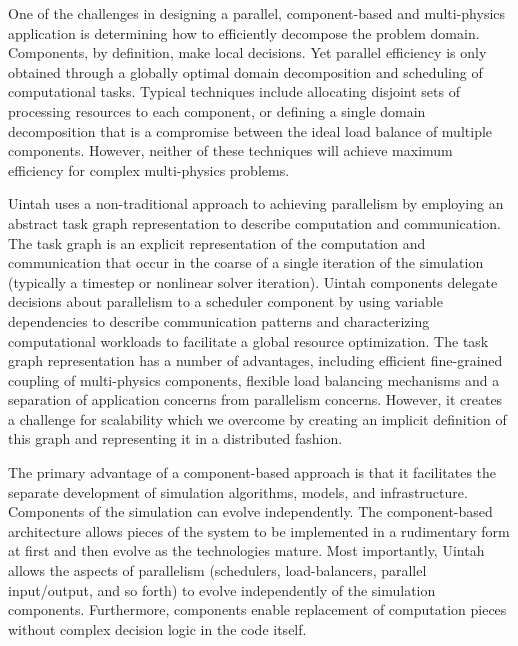 One of the challenges in designing a parallel, component-based and
multi-physics application is determining how to efficiently decompose
the problem domain. Components, by definition, make local
decisions. Yet parallel efficiency is only obtained through a globally
optimal domain decomposition and scheduling of computational
tasks. Typical techniques include allocating disjoint sets of
processing resources to each component, or defining a single domain
decomposition that is a compromise between the ideal load balance of
multiple components. However, neither of these techniques will achieve
maximum efficiency for complex multi-physics problems.

Uintah uses a non-traditional approach to achieving parallelism by
employing an abstract task graph representation to describe
computation and communication. The task graph is an explicit
representation of the computation and communication that occur in the
coarse of a single iteration of the simulation (typically a timestep
or nonlinear solver iteration). Uintah components delegate decisions
about parallelism to a scheduler component by using variable
dependencies to describe communication patterns and characterizing
computational workloads to facilitate a global resource
optimization. The task graph representation has a number of
advantages, including efficient fine-grained coupling of multi-physics
components, flexible load balancing mechanisms and a separation of
application concerns from parallelism concerns. However, it creates a
challenge for scalability which we overcome by creating an implicit
definition of this graph and representing it in a distributed fashion.


The primary advantage of a component-based approach is that it
facilitates the separate development of simulation algorithms, models,
and infrastructure. Components of the simulation can evolve
independently. The component-based architecture allows pieces of the
system to be implemented in a rudimentary form at first and then
evolve as the technologies mature. Most importantly, Uintah allows the
aspects of parallelism (schedulers, load-balancers, parallel
input/output, and so forth) to evolve independently of the simulation
components. Furthermore, components enable replacement of computation
pieces without complex decision logic in the code itself.

